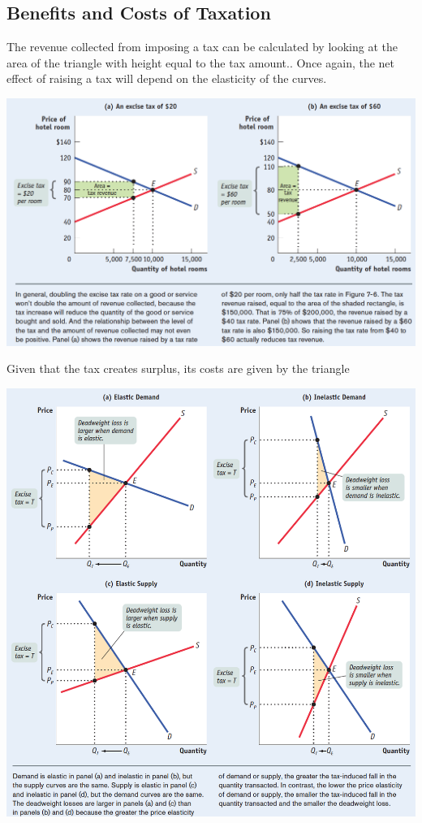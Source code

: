 \documentclass[english,course,draft]{Notes}
\begin{document}
\subsection{Benefits and Costs of Taxation}

\par{The revenue collected from imposing a tax can be calculated by looking at the area of the triangle with height equal to the tax amount.. Once again, the net effect of raising a tax will depend on the elasticity of the curves.}

\includegraphics[width=\textwidth]{tax4}

\par{Given that the tax creates surplus, its costs are given by the  triangle}

\includegraphics[scale=0.5]{tax5}
\end{document}
